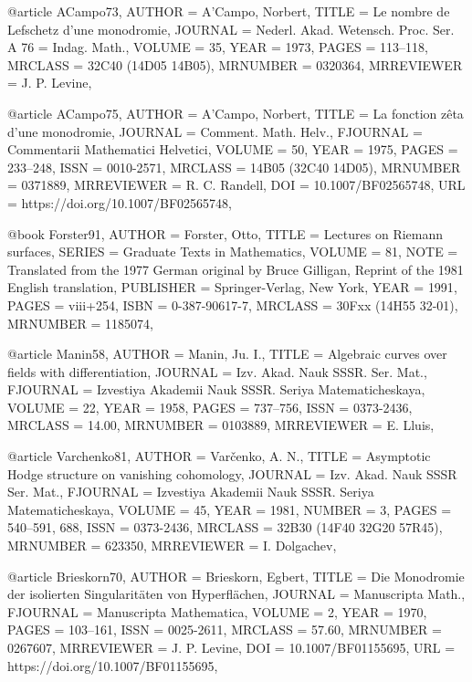 @article {ACampo73,
    AUTHOR = {A'Campo, Norbert},
     TITLE = {Le nombre de Lefschetz d'une monodromie},
   JOURNAL = {Nederl. Akad. Wetensch. Proc. Ser. A 76 = Indag. Math.},
    VOLUME = {35},
      YEAR = {1973},
     PAGES = {113--118},
   MRCLASS = {32C40 (14D05 14B05)},
  MRNUMBER = {0320364},
MRREVIEWER = {J. P. Levine},
}

@article {ACampo75,
    AUTHOR = {A'Campo, Norbert},
     TITLE = {La fonction z\^{e}ta d'une monodromie},
   JOURNAL = {Comment. Math. Helv.},
  FJOURNAL = {Commentarii Mathematici Helvetici},
    VOLUME = {50},
      YEAR = {1975},
     PAGES = {233--248},
      ISSN = {0010-2571},
   MRCLASS = {14B05 (32C40 14D05)},
  MRNUMBER = {0371889},
MRREVIEWER = {R. C. Randell},
       DOI = {10.1007/BF02565748},
       URL = {https://doi.org/10.1007/BF02565748},
}

@book {Forster91,
    AUTHOR = {Forster, Otto},
     TITLE = {Lectures on {R}iemann surfaces},
    SERIES = {Graduate Texts in Mathematics},
    VOLUME = {81},
      NOTE = {Translated from the 1977 German original by Bruce Gilligan,
              Reprint of the 1981 English translation},
 PUBLISHER = {Springer-Verlag, New York},
      YEAR = {1991},
     PAGES = {viii+254},
      ISBN = {0-387-90617-7},
   MRCLASS = {30Fxx (14H55 32-01)},
  MRNUMBER = {1185074},
}

@article {Manin58,
    AUTHOR = {Manin, Ju. I.},
     TITLE = {Algebraic curves over fields with differentiation},
   JOURNAL = {Izv. Akad. Nauk SSSR. Ser. Mat.},
  FJOURNAL = {Izvestiya Akademii Nauk SSSR. Seriya Matematicheskaya},
    VOLUME = {22},
      YEAR = {1958},
     PAGES = {737--756},
      ISSN = {0373-2436},
   MRCLASS = {14.00},
  MRNUMBER = {0103889},
MRREVIEWER = {E. Lluis},
}

@article {Varchenko81,
    AUTHOR = {Var\v{c}enko, A. N.},
     TITLE = {Asymptotic {H}odge structure on vanishing cohomology},
   JOURNAL = {Izv. Akad. Nauk SSSR Ser. Mat.},
  FJOURNAL = {Izvestiya Akademii Nauk SSSR. Seriya Matematicheskaya},
    VOLUME = {45},
      YEAR = {1981},
    NUMBER = {3},
     PAGES = {540--591, 688},
      ISSN = {0373-2436},
   MRCLASS = {32B30 (14F40 32G20 57R45)},
  MRNUMBER = {623350},
MRREVIEWER = {I. Dolgachev},
}

@article {Brieskorn70,
    AUTHOR = {Brieskorn, Egbert},
     TITLE = {Die {M}onodromie der isolierten {S}ingularit\"{a}ten von
              {H}yperfl\"{a}chen},
   JOURNAL = {Manuscripta Math.},
  FJOURNAL = {Manuscripta Mathematica},
    VOLUME = {2},
      YEAR = {1970},
     PAGES = {103--161},
      ISSN = {0025-2611},
   MRCLASS = {57.60},
  MRNUMBER = {0267607},
MRREVIEWER = {J. P. Levine},
       DOI = {10.1007/BF01155695},
       URL = {https://doi.org/10.1007/BF01155695},
}

